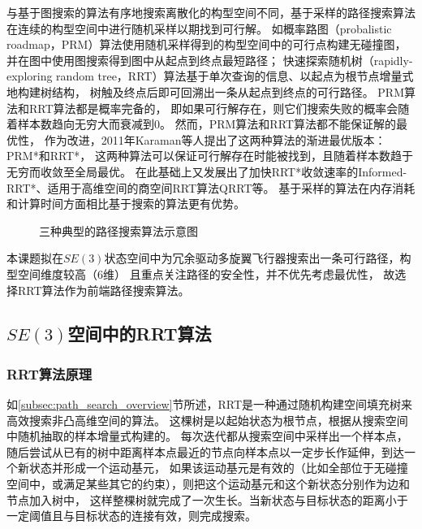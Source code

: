 与基于图搜索的算法有序地搜索离散化的构型空间不同，基于采样的路径搜索算法在连续的构型空间中进行随机采样以期找到可行解。
如概率路图（probalistic roadmap，PRM）算法\cite{kavraki1996probabilistic}使用随机采样得到的构型空间中的可行点构建无碰撞图，
并在图中使用图搜索得到图中从起点到终点最短路径；
快速探索随机树（rapidly-exploring random tree，RRT）\cite{lavalle1998rapidly}算法基于单次查询的信息、以起点为根节点增量式地构建树结构，
树触及终点后即可回溯出一条从起点到终点的可行路径。
PRM算法和RRT算法都是概率完备的\cite{kavraki1998analysis,frazzoli2002real}，
即如果可行解存在，则它们搜索失败的概率会随着样本数趋向无穷大而衰减到0。
然而，PRM算法和RRT算法都不能保证解的最优性，
作为改进，2011年Karaman等人提出了这两种算法的渐进最优版本：PRM*和RRT*\cite{karaman2011sampling}，
这两种算法可以保证可行解存在时能被找到，且随着样本数趋于无穷而收敛至全局最优。
在此基础上又发展出了加快RRT*收敛速率的Informed-RRT*\cite{gammell2014informed}、适用于高维空间的商空间RRT算法QRRT\cite{orthey2019rapidly}等。
基于采样的算法在内存消耗和计算时间方面相比基于搜索的算法更有优势。
\begin{figure}[!ht]
  \setlength{\subfigcapskip}{-1bp}
  \centering
  \begin{minipage}{\textwidth}
  \centering
  \subfigure{\label{fig:schem_diag_jps}}\addtocounter{subfigure}{-2}
  \hspace{0.2em}
  \subfigure{\label{fig:schem_diag_prm}}\addtocounter{subfigure}{-2}
  \hspace{0.2em}
  \subfigure{\label{fig:schem_diag_rrt}}\addtocounter{subfigure}{-2}
  \end{minipage}
  \caption{三种典型的路径搜索算法示意图\label{fig:three_methods_of_path_search}}
\end{figure}

本课题拟在$SE(3)$状态空间中为冗余驱动多旋翼飞行器搜索出一条可行路径，构型空间维度较高（6维）
且重点关注路径的安全性，并不优先考虑最优性，
故选择RRT算法作为前端路径搜索算法。
\subsection{$SE(3)$空间中的RRT算法}\label{subsec:rrt_in_SE3}
\subsubsection{RRT算法原理}\label{subsubsec:process_of_rrt}
如\ref{subsec:path_search_overview}节所述，RRT是一种通过随机构建空间填充树来高效搜索非凸高维空间的算法。
这棵树是以起始状态为根节点，根据从搜索空间中随机抽取的样本增量式构建的。
每次迭代都从搜索空间中采样出一个样本点，随后尝试从已有的树中距离样本点最近的节点向样本点以一定步长作延伸，到达一个新状态并形成一个运动基元，
如果该运动基元是有效的（比如全部位于无碰撞空间中，或满足某些其它的约束），则把这个运动基元和这个新状态分别作为边和节点加入树中，
这样整棵树就完成了一次生长。当新状态与目标状态的距离小于一定阈值且与目标状态的连接有效，则完成搜索。

